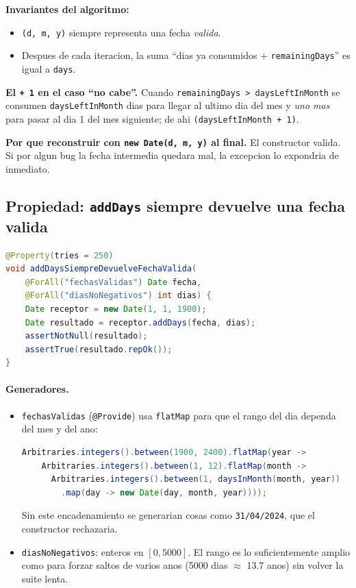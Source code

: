 \documentclass[12pt,a4paper]{article}
\begin{document}
\textbf{Invariantes del algoritmo:}
\begin{itemize}
  \item \texttt{(d, m, y)} siempre representa una fecha \emph{valida}.
  \item Despues de cada iteracion, la suma ``dias ya consumidos $+$ \texttt{remainingDays}''
  es igual a \texttt{days}.
\end{itemize}

\textbf{El \texttt{+ 1} en el caso ``no cabe''.} Cuando \texttt{remainingDays > daysLeftInMonth}
se consumen \texttt{daysLeftInMonth} dias para llegar al ultimo dia del mes y \emph{uno mas}
para pasar al dia 1 del mes siguiente; de ahi \texttt{(daysLeftInMonth + 1)}.

\textbf{Por que reconstruir con \texttt{new Date(d, m, y)} al final.} El constructor valida.
Si por algun bug la fecha intermedia quedara mal, la excepcion lo expondria de inmediato.

\subsection{Propiedad: \texttt{addDays} siempre devuelve una fecha valida}

\begin{lstlisting}[style=codestyle,language=Java]
@Property(tries = 250)
void addDaysSiempreDevuelveFechaValida(
    @ForAll("fechasValidas") Date fecha,
    @ForAll("diasNoNegativos") int dias) {
    Date receptor = new Date(1, 1, 1900);
    Date resultado = receptor.addDays(fecha, dias);
    assertNotNull(resultado);
    assertTrue(resultado.repOk());
}
\end{lstlisting}

\paragraph{Generadores.}

\begin{itemize}
  \item \texttt{fechasValidas} (\texttt{@Provide}) usa \texttt{flatMap} para que el rango del
  dia dependa del mes y del ano:
  \begin{lstlisting}[style=codestyle,language=Java]
  Arbitraries.integers().between(1900, 2400).flatMap(year ->
    Arbitraries.integers().between(1, 12).flatMap(month ->
      Arbitraries.integers().between(1, daysInMonth(month, year))
        .map(day -> new Date(day, month, year))));
  \end{lstlisting}
  Sin este encadenamiento se generarian cosas como \texttt{31/04/2024}, que el constructor
  rechazaria.
  \item \texttt{diasNoNegativos}: enteros en $[0, 5000]$. El rango es lo suficientemente amplio
  como para forzar saltos de varios anos (5000 dias $\approx$ 13.7 anos) sin volver la suite
  lenta.
\end{itemize}
\end{document}

